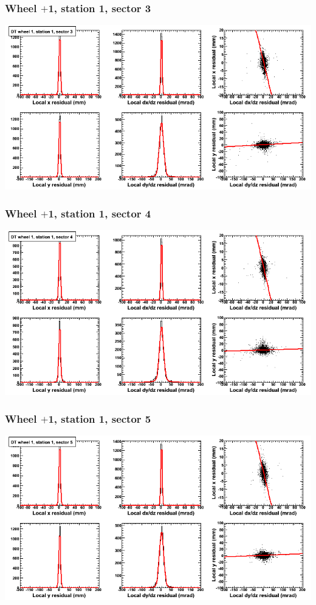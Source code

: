 \documentclass[compress]{beamer}
\begin{document}
\begin{frame}
\frametitle{Wheel $+$1, station 1, sector 3}
\includegraphics[width=\linewidth]{tmpbell_MBwhDst1sec03.png}
\end{frame}

\begin{frame}
\frametitle{Wheel $+$1, station 1, sector 4}
\includegraphics[width=\linewidth]{tmpbell_MBwhDst1sec04.png}
\end{frame}

\begin{frame}
\frametitle{Wheel $+$1, station 1, sector 5}
\includegraphics[width=\linewidth]{tmpbell_MBwhDst1sec05.png}
\end{frame}
\end{document}
